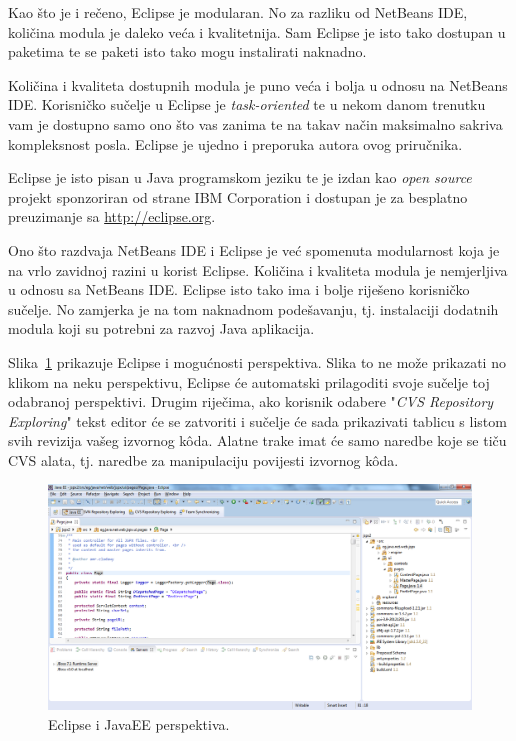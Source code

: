 Kao što je i rečeno, Eclipse je modularan. No za razliku od NetBeans IDE, količina modula je daleko veća i kvalitetnija. Sam Eclipse je isto tako dostupan u paketima te se paketi isto tako mogu instalirati naknadno.

\begin{tipbox}
    Količina i kvaliteta dostupnih modula je puno veća i bolja u odnosu na NetBeans IDE. Korisničko sučelje u Eclipse je \emph{task-oriented} te u nekom danom trenutku vam je dostupno samo ono što vas zanima te na takav način maksimalno sakriva kompleksnost posla. Eclipse je ujedno i preporuka autora ovog priručnika.
\end{tipbox}

Eclipse je isto pisan u Java programskom jeziku te je izdan kao \emph{open source} projekt sponzoriran od strane IBM Corporation i dostupan je za besplatno preuzimanje sa \url{http://eclipse.org}.

Ono što razdvaja NetBeans IDE i Eclipse je već spomenuta modularnost koja je na vrlo zavidnoj razini u korist Eclipse. Količina i kvaliteta modula je nemjerljiva u odnosu sa NetBeans IDE. Eclipse isto tako ima i bolje riješeno korisničko sučelje. No zamjerka je na tom naknadnom podešavanju, tj. instalaciji dodatnih modula koji su potrebni za razvoj Java aplikacija.

Slika~\ref{fig:eclipse_overview} prikazuje Eclipse i mogućnosti perspektiva. Slika to ne može prikazati no klikom na neku perspektivu, Eclipse će automatski prilagoditi svoje sučelje toj odabranoj perspektivi. Drugim riječima, ako korisnik odabere "\emph{CVS Repository Exploring}" tekst editor će se zatvoriti i sučelje će sada prikazivati tablicu s listom svih revizija vašeg izvornog kôda. Alatne trake imat će samo naredbe koje se tiču CVS alata, tj. naredbe za manipulaciju povijesti izvornog kôda.

\begin{figure}[!htbp]
    \caption{Eclipse i JavaEE perspektiva.}
    \label{fig:eclipse_overview}
    \centering
    \includegraphics[max width=\textwidth]{images/eclipse_overview.png}
\end{figure}

